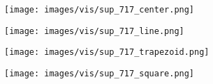 \documentclass[10pt,twocolumn,letterpaper]{article}
\begin{document}
\begin{figure*}[t]
        \begin{subfigure}[b]{0.23\textwidth}
  \texttt{[image: images/vis/sup\_717\_center.png]}
    \end{subfigure}%
    \begin{subfigure}[b]{0.23\textwidth}
  \texttt{[image: images/vis/sup\_717\_line.png]}
    \end{subfigure}%
    \begin{subfigure}[b]{0.23\textwidth}
  \texttt{[image: images/vis/sup\_717\_trapezoid.png]}
    \end{subfigure}%
    \begin{subfigure}[b]{0.23\textwidth}
  \texttt{[image: images/vis/sup\_717\_square.png]}
    \end{subfigure}%


\end{figure*}
\end{document}
